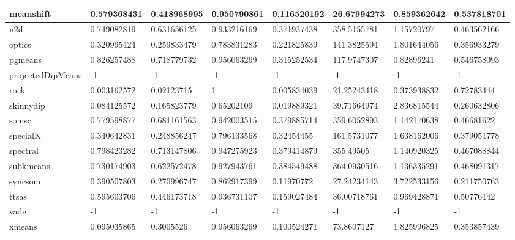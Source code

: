 \begin{table}[H]
\begin{tabular}{|l|l|l|l|l|l|l|l|}
\hline
meanshift & 0.579368431 & 0.418968995 & 0.950790861 & 0.116520192 & 26.67994273 & 0.859362642 & 0.537818701 \\
\hline
n2d & 0.749082819 & 0.631656125 & 0.933216169 & 0.371937438 & 358.5155781 & 1.15720797 & 0.463562166 \\
\hline
optics & 0.320995424 & 0.259833479 & 0.783831283 & 0.221825839 & 141.3825594 & 1.801644056 & 0.356933279 \\
\hline
pgmeans & 0.826257488 & 0.718779732 & 0.956063269 & 0.315252534 & 117.9747307 & 0.82896241 & 0.546758093 \\
\hline
projectedDipMeans & -1 & -1 & -1 & -1 & -1 & -1 & -1 \\
\hline
rock & 0.003162572 & 0.02123715 & 1 & 0.005834039 & 21.25243418 & 0.373938832 & 0.72783444 \\
\hline
skinnydip & 0.084125572 & 0.165823779 & 0.65202109 & 0.019889321 & 39.71664974 & 2.836815544 & 0.260632806 \\
\hline
somsc & 0.779598877 & 0.681161563 & 0.942003515 & 0.379885714 & 359.6052893 & 1.142170638 & 0.46681622 \\
\hline
specialK & 0.340642831 & 0.248856247 & 0.796133568 & 0.32454455 & 161.5731077 & 1.638162006 & 0.379051778 \\
\hline
spectral & 0.798423282 & 0.713147806 & 0.947275923 & 0.379414879 & 355.49505 & 1.140920325 & 0.467088844 \\
\hline
subkmeans & 0.730174903 & 0.622572478 & 0.927943761 & 0.384549488 & 364.0930516 & 1.136335291 & 0.468091317 \\
\hline
syncsom & 0.390507803 & 0.270996747 & 0.862917399 & 0.11970772 & 27.24234143 & 3.722533156 & 0.211750763 \\
\hline
ttsas & 0.595603706 & 0.446173718 & 0.936731107 & 0.159027484 & 36.00718761 & 0.969428871 & 0.50776142 \\
\hline
vade & -1 & -1 & -1 & -1 & -1 & -1 & -1 \\
\hline
xmeans & 0.095035865 & 0.3005526 & 0.956063269 & 0.100524271 & 73.8607127 & 1.825996825 & 0.353857439 \\
\hline
\end{tabular}
\end{table}

\clearpage


